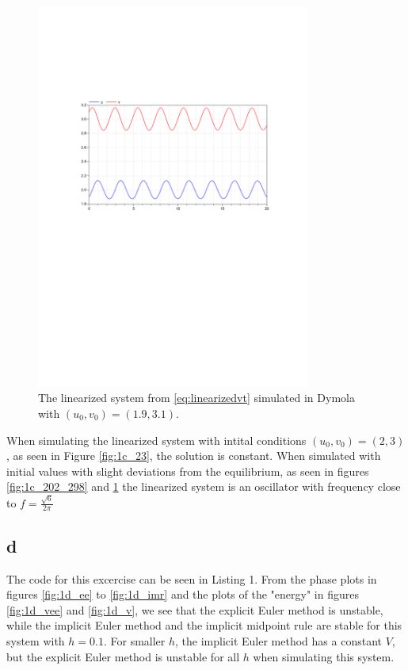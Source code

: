 \documentclass{article}
\begin{document}
\begin{figure}[H]
    \centering
    \includegraphics[width = 0.8\textwidth]{ex6_1c_19_31}
    \caption{The linearized system from \ref{eq:linearizedvt} simulated in Dymola with $(u_0,v_0) = (1.9,3.1)$.}
    \label{fig:1c_19_31}
\end{figure}

When simulating the linearized system with intital conditions $(u_0,v_0) = (2,3)$, as seen in Figure \ref{fig:1c_23}, the solution is constant. When simulated with initial values with slight deviations from the equilibrium, as seen in figures \ref{fig:1c_202_298} and \ref{fig:1c_19_31} the linearized system is an oscillator with frequency close to $f = \frac{\sqrt{6}}{2\pi}$

\subsection{d}

The code for this excercise can be seen in Listing 1. From the phase plots in figures \ref{fig:1d_ee} to \ref{fig:1d_imr} and the plots of the "energy" in figures \ref{fig:1d_vee} and \ref{fig:1d_v}, we see that the explicit Euler method is unstable, while the implicit Euler method and the implicit midpoint rule are stable for this system with $h = 0.1$. For smaller $h$, the implicit Euler method has a constant $V$, but the explicit Euler method is unstable for all $h$ when simulating this system.
\end{document}
